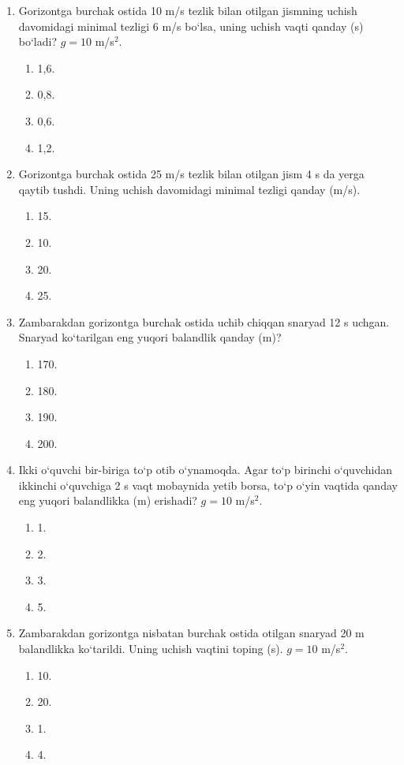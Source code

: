 \begin{enumerate}
\item Gorizontga burchak ostida 10 m/s tezlik bilan otilgan jismning uchish davomidagi minimal tezligi 6 m/s bo‘lsa, uning uchish vaqti qanday (s) bo‘ladi? $g=10$ m/s$^2$.
\begin{enumerate}[label=\Alph*)]
\item 1,6.
\item 0,8.
\item 0,6.
\item 1,2.
\end{enumerate}

\item Gorizontga burchak ostida 25 m/s tezlik bilan otilgan jism 4 s da yerga qaytib tushdi. Uning uchish davomidagi minimal tezligi qanday (m/s).
\begin{enumerate}[label=\Alph*)]
\item 15.
\item 10.
\item 20.
\item 25.
\end{enumerate}

\item Zambarakdan gorizontga burchak ostida uchib chiqqan snaryad 12 s uchgan. Snaryad ko‘tarilgan eng yuqori balandlik qanday (m)?
\begin{enumerate}[label=\Alph*)]
\item 170.
\item 180.
\item 190.
\item 200.
\end{enumerate}

\item Ikki o‘quvchi bir-biriga to‘p otib o‘ynamoqda. Agar to‘p birinchi o‘quvchidan ikkinchi o‘quvchiga 2 s vaqt mobaynida yetib borsa, to‘p o‘yin vaqtida qanday eng yuqori balandlikka (m) erishadi? $g=10$ m/s$^2$.
\begin{enumerate}[label=\Alph*)]
\item 1.
\item 2.
\item 3.
\item 5.
\end{enumerate}

\item Zambarakdan gorizontga nisbatan burchak ostida otilgan snaryad 20 m balandlikka ko‘tarildi. Uning uchish vaqtini toping (s). $g=10$ m/s$^2$.
\begin{enumerate}[label=\Alph*)]
\item 10.
\item 20.
\item 1.
\item 4.
\end{enumerate}




\end{enumerate}
